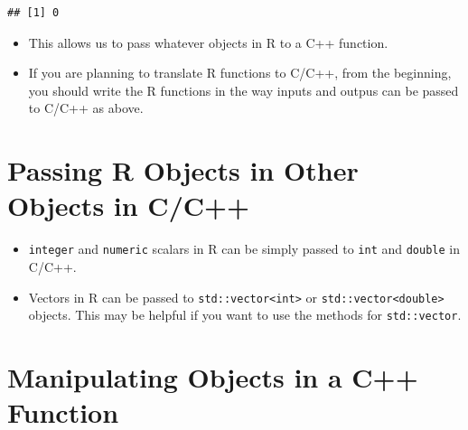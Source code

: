 \documentclass[
]{book}
\newenvironment{Shaded}{\begin{snugshade}}{\end{snugshade}}
\newcommand{\CommentTok}[1]{\textcolor[rgb]{0.56,0.35,0.01}{\textit{#1}}}
\newcommand{\FunctionTok}[1]{\textcolor[rgb]{0.00,0.00,0.00}{#1}}
\newcommand{\NormalTok}[1]{#1}
\newcommand{\OtherTok}[1]{\textcolor[rgb]{0.56,0.35,0.01}{#1}}
\newcommand{\SpecialCharTok}[1]{\textcolor[rgb]{0.00,0.00,0.00}{#1}}
\providecommand{\tightlist}{%
  \setlength{\itemsep}{0pt}\setlength{\parskip}{0pt}}
\begin{document}
\begin{Shaded}
\end{Shaded}

\begin{verbatim}
## [1] 0
\end{verbatim}

\begin{itemize}
\tightlist
\item
  This allows us to pass whatever objects in R to a C++ function.
\item
  If you are planning to translate R functions to C/C++, from the beginning, you should write the R functions in the way inputs and outpus can be passed to C/C++ as above.
\end{itemize}

\hypertarget{passing-r-objects-in-other-objects-in-cc}{%
\section{Passing R Objects in Other Objects in C/C++}\label{passing-r-objects-in-other-objects-in-cc}}

\begin{itemize}
\tightlist
\item
  \texttt{integer} and \texttt{numeric} scalars in R can be simply passed to \texttt{int} and \texttt{double} in C/C++.
\item
  Vectors in R can be passed to \texttt{std::vector\textless{}int\textgreater{}} or \texttt{std::vector\textless{}double\textgreater{}} objects. This may be helpful if you want to use the methods for \texttt{std::vector}.
\end{itemize}

\hypertarget{manipulating-objects-in-a-c-function}{%
\section{Manipulating Objects in a C++ Function}\label{manipulating-objects-in-a-c-function}}
\end{document}
